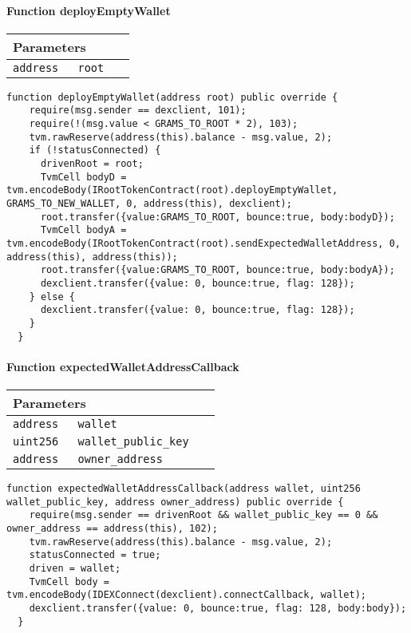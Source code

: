 \paragraph{Function deployEmptyWallet}


\ifsoltables
\noindent\begin{tabular}{|l|l|p{5cm}|}\hline
\multicolumn{3}{|l|}{\bf Parameters}\\\hline
\tt address & \tt root &\\\hline
\end{tabular}
\fi

\vspace{2cm}

\begin{lstlisting}[firstnumber=60]
  function deployEmptyWallet(address root) public override {
    require(msg.sender == dexclient, 101);
    require(!(msg.value < GRAMS_TO_ROOT * 2), 103);
    tvm.rawReserve(address(this).balance - msg.value, 2);
    if (!statusConnected) {
      drivenRoot = root;
      TvmCell bodyD = tvm.encodeBody(IRootTokenContract(root).deployEmptyWallet, GRAMS_TO_NEW_WALLET, 0, address(this), dexclient);
      root.transfer({value:GRAMS_TO_ROOT, bounce:true, body:bodyD});
      TvmCell bodyA = tvm.encodeBody(IRootTokenContract(root).sendExpectedWalletAddress, 0, address(this), address(this));
      root.transfer({value:GRAMS_TO_ROOT, bounce:true, body:bodyA});
      dexclient.transfer({value: 0, bounce:true, flag: 128});
    } else {
      dexclient.transfer({value: 0, bounce:true, flag: 128});
    }
  }
\end{lstlisting}

\paragraph{Function expectedWalletAddressCallback}


\ifsoltables
\noindent\begin{tabular}{|l|l|p{5cm}|}\hline
\multicolumn{3}{|l|}{\bf Parameters}\\\hline
\tt address & \tt wallet &\\\hline
\tt uint256 & \tt wallet\_{}public\_{}key &\\\hline
\tt address & \tt owner\_{}address &\\\hline
\end{tabular}
\fi

\vspace{2cm}

\begin{lstlisting}[firstnumber=77]
  function expectedWalletAddressCallback(address wallet, uint256 wallet_public_key, address owner_address) public override {
    require(msg.sender == drivenRoot && wallet_public_key == 0 && owner_address == address(this), 102);
    tvm.rawReserve(address(this).balance - msg.value, 2);
    statusConnected = true;
    driven = wallet;
    TvmCell body = tvm.encodeBody(IDEXConnect(dexclient).connectCallback, wallet);
    dexclient.transfer({value: 0, bounce:true, flag: 128, body:body});
  }
\end{lstlisting}

